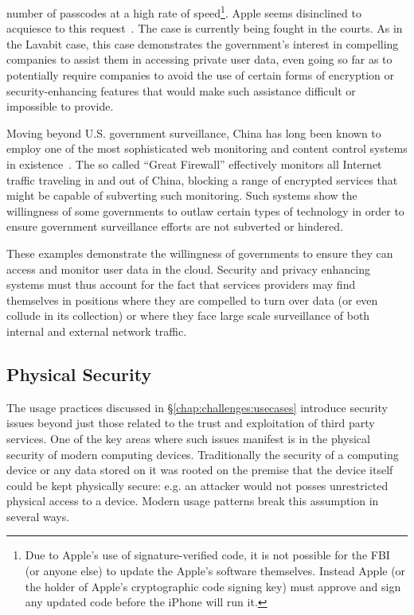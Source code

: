 \begin{packed_desc}
  number of passcodes at a high rate of speed\footnote{Due to Apple's
    use of signature-verified code, it is not possible for the FBI (or
    anyone else) to update the Apple's software themselves. Instead
    Apple (or the holder of Apple's cryptographic code signing key)
    must approve and sign any updated code before the iPhone will run
    it.}\cite{eff-applecrypto}. Apple seems disinclined to acquiesce
  to this request~\cite{apple-fbiletter}. The case is currently being
  fought in the courts. As in the Lavabit case, this case demonstrates
  the government's interest in compelling companies to assist them in
  accessing private user data, even going so far as to potentially
  require companies to avoid the use of certain forms of encryption or
  security-enhancing features that would make such assistance
  difficult or impossible to provide.
\item[The Great Firewall:] Moving beyond U.S. government surveillance,
  China has long been known to employ one of the most sophisticated
  web monitoring and content control systems in
  existence~\cite{rsf-china}. The so called ``Great Firewall''
  effectively monitors all Internet traffic traveling in and out of
  China, blocking a range of encrypted services that might be capable
  of subverting such monitoring. Such systems show the willingness of
  some governments to outlaw certain types of technology in order to
  ensure government surveillance efforts are not subverted or
  hindered.
\end{packed_desc}

These examples demonstrate the willingness of governments to ensure
they can access and monitor user data in the cloud. Security and
privacy enhancing systems must thus account for the fact that services
providers may find themselves in positions where they are compelled to
turn over data (or even collude in its collection) or where they face
large scale surveillance of both internal and external network
traffic.

\subsection{Physical Security}

The usage practices discussed in \S\ref{chap:challenges:usecases}
introduce security issues beyond just those related to the trust and
exploitation of third party services. One of the key areas where such
issues manifest is in the physical security of modern computing
devices. Traditionally the security of a computing device or any data
stored on it was rooted on the premise that the device itself could be
kept physically secure: e.g. an attacker would not posses unrestricted
physical access to a device. Modern usage patterns break this
assumption in several ways.

